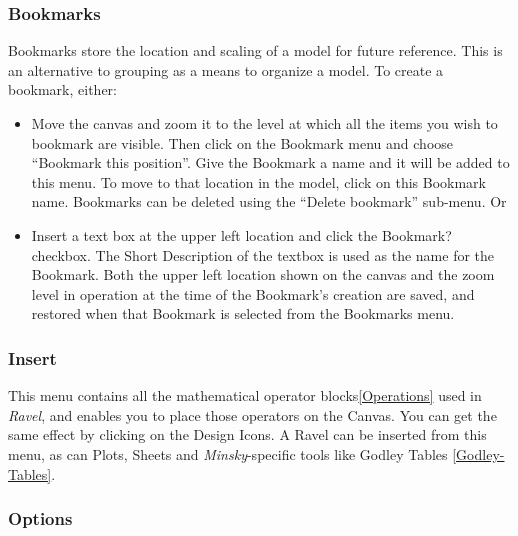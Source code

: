 \subsubsection{Bookmarks}

\label{Bookmarks} Bookmarks store the location and scaling of a model
for future reference. This is an alternative to grouping as a means
to organize a model. To create a bookmark, either:
\begin{itemize}
\item Move the canvas and zoom it to the level at which all the items you
wish to bookmark are visible. Then click on the Bookmark menu and
choose ``Bookmark this position''. Give the Bookmark a name and it
will be added to this menu. To move to that location in the model,
click on this Bookmark name. Bookmarks can be deleted using the ``Delete
bookmark'' sub-menu. Or
\item Insert a text box at the upper left location and click the Bookmark?
checkbox. The Short Description of the textbox is used as the name
for the Bookmark. Both the upper left location shown on the canvas
and the zoom level in operation at the time of the Bookmark's creation
are saved, and restored when that Bookmark is selected from the Bookmarks
menu.
\end{itemize}

\subsubsection{Insert}

\label{Insert}

This menu contains all the mathematical operator blocks\ref{Operations}
used in \emph{Ravel}, and enables you to place those operators on
the Canvas. You can get the same effect by clicking on the Design
Icons. A Ravel can be inserted from this menu, as can Plots, Sheets
and \emph{Minsky}-specific tools like Godley Tables \ref{Godley-Tables}.

\subsubsection{Options}

\label{Options}

